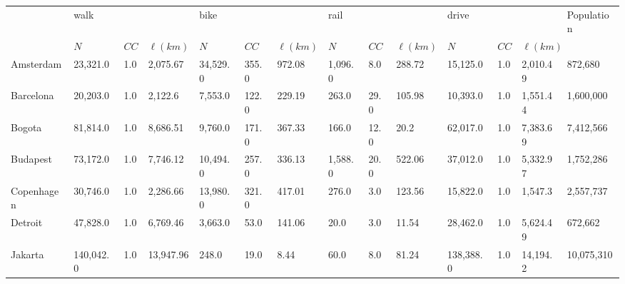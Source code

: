 \begin{table}[th!]
  \centering
  \begin{adjustbox}{width=\textwidth,keepaspectratio}
    \begin{tabular}{llllllllllllll}
      \toprule
      {}         & \multicolumn{3}{l}{walk} & \multicolumn{3}{l}{bike} & \multicolumn{3}{l}{rail} & \multicolumn{3}{l}{drive} & Population                                                                                                             \\
      {}         & $N$                      & $CC$                     & $\ell(km)$               & $N$                       & $CC$       & $\ell(km)$ & $N$     & $CC$ & $\ell(km)$ & $N$       & $CC$ & \multicolumn{2}{l}{$\ell(km)$}              \\
      \midrule
      Amsterdam  & 23,321.0                 & 1.0                      & 2,075.67                 & 34,529.0                  & 355.0      & 972.08     & 1,096.0 & 8.0  & 288.72     & 15,125.0  & 1.0  & 2,010.49                       & 872,680    \\
      Barcelona  & 20,203.0                 & 1.0                      & 2,122.6                  & 7,553.0                   & 122.0      & 229.19     & 263.0   & 29.0 & 105.98     & 10,393.0  & 1.0  & 1,551.44                       & 1,600,000  \\
      Bogota     & 81,814.0                 & 1.0                      & 8,686.51                 & 9,760.0                   & 171.0      & 367.33     & 166.0   & 12.0 & 20.2       & 62,017.0  & 1.0  & 7,383.69                       & 7,412,566  \\
      Budapest   & 73,172.0                 & 1.0                      & 7,746.12                 & 10,494.0                  & 257.0      & 336.13     & 1,588.0 & 20.0 & 522.06     & 37,012.0  & 1.0  & 5,332.97                       & 1,752,286  \\
      Copenhagen & 30,746.0                 & 1.0                      & 2,286.66                 & 13,980.0                  & 321.0      & 417.01     & 276.0   & 3.0  & 123.56     & 15,822.0  & 1.0  & 1,547.3                        & 2,557,737  \\
      Detroit    & 47,828.0                 & 1.0                      & 6,769.46                 & 3,663.0                   & 53.0       & 141.06     & 20.0    & 3.0  & 11.54      & 28,462.0  & 1.0  & 5,624.49                       & 672,662    \\
      Jakarta    & 140,042.0                & 1.0                      & 13,947.96                & 248.0                     & 19.0       & 8.44       & 60.0    & 8.0  & 81.24      & 138,388.0 & 1.0  & 14,194.2                       & 10,075,310 \\

\end{tabular}
\end{adjustbox}
\end{table}
